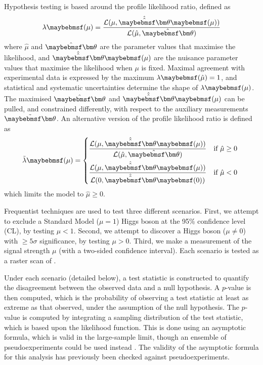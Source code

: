 Hypothesis testing is based around the profile likelihood ratio, defined as
\begin{equation}
	\lambda\parenths{\mu} = \frac{\mathcal{L}(\mu, \hat{\hat{\bvec{\theta}}}\parenths{\mu})}{\mathcal{L}(\hat{\mu}, \hat{\bvec{\theta}})}
\end{equation}
where $\hat{\mu}$ and $\hat{\bvec{\theta}}$ are the parameter values that maximise the 
likelihood, and $\hat{\hat{\bvec{\theta}}}\parenths{\mu}$ are the nuisance parameter values 
that maximise the likelihood when $\mu$ is fixed. Maximal agreement with experimental data 
is expressed by the maximum $\lambda\parenths{\hat{\mu}} = 1$, and statistical and 
systematic uncertainties determine the shape of $\lambda\parenths{\mu}$. The maximised 
$\hat{\bvec{\theta}}$ and $\hat{\hat{\bvec{\theta}}}\parenths{\mu}$ can be pulled, and 
constrained differently, with respect to the auxiliary measurements $\tilde{\bvec{\theta}}$. 
An alternative version of the profile likelihood ratio is defined as
\begin{equation}
	\tilde{\lambda}\parenths{\mu} = 
	\begin{dcases*}
		\frac{\mathcal{L}(\mu, \hat{\hat{\bvec{\theta}}}\parenths{\mu})}{\mathcal{L}(\hat{\mu}, \hat{\bvec{\theta}})} & if $\hat{\mu} \geq 0$ \\
		\frac{\mathcal{L}(\mu, \hat{\hat{\bvec{\theta}}}\parenths{\mu})}{\mathcal{L}(0, \hat{\hat{\bvec{\theta}}}\parenths{0})} & if $\hat{\mu} < 0$
	\end{dcases*}
\end{equation}
which limits the model to $\hat{\mu} \geq 0$.

Frequentist techniques are used to test three different scenarios. First, we attempt to 
exclude a Standard Model (\ie $\mu = 1$) Higgs boson at the 95\% confidence level (CL), by 
testing $\mu < 1$. Second, we attempt to discover a Higgs boson (\ie $\mu \neq 0$) with 
$\geq\!5\sigma$ significance, by testing $\mu > 0$. Third, we make a measurement of the 
signal strength $\mu$ (with a two-sided confidence interval). Each scenario is tested as 
a raster scan of \mH.

Under each scenario (detailed below), a test statistic is constructed to quantify the 
disagreement between the observed data and a null hypothesis. A $p$-value is then 
computed, which is the probability of observing a test statistic at least as extreme as that 
observed, under the assumption of the null hypothesis. The $p$-value is computed by 
integrating a sampling distribution of the test statistic, which is based upon the 
likelihood function. This is done using an asymptotic formula, which is valid in the 
large-sample limit, though an ensemble of pseudoexperiments could be used instead 
\cite{Cowan:2010}. The validity of the asymptotic formula for this analysis has previously 
been checked against pseudoexperiments.

